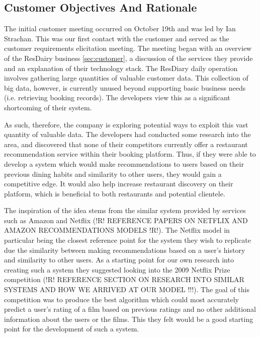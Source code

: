 \documentclass{l3proj}
\begin{document}

\subsection{Customer Objectives And Rationale}
\label{sec:custobjectives}


The initial customer meeting occurred on October 19th and was led by Ian Strachan. This was our first contact with the customer and served as the customer requirements elicitation meeting. The meeting began with an overview of the ResDairy business \ref{sec:customer}, a discussion of the services they provide and an explanation of their technology stack. The ResDiary daily operation involves gathering large quantities of valuable customer data. This collection of big data, however, is currently unused beyond supporting basic business needs (i.e. retrieving booking records). The developers view this as a significant shortcoming of their system.

As such, therefore, the company is exploring potential ways to exploit this vast quantity of valuable data. The developers had conducted some research into the area, and discovered that none of their competitors currently offer a restaurant recommendation service within their booking platform. Thus, if they were able to develop a system which would make recommendations to users based on their previous dining habits and similarity to other users, they would gain a competitive edge. It would also help increase restaurant discovery on their platform, which is beneficial to both restaurants and potential clientele. 

The inspiration of the idea stems from the similar system provided by services such as Amazon and Netflix (!R! REFERENCE PAPERS ON NETFLIX AND AMAZON RECOMMENDATIONS MODELS !R!). The Netflix model in particular being the closest reference point for the system they wish to replicate due the similarity between making recommendations based on a user’s history and similarity to other users. As a starting point for our own research into creating such a system they suggested looking into the 2009 Netflix Prize competition (!R! REFERENCE SECTION ON RESEARCH INTO SIMILAR SYSTEMS AND HOW WE ARRIVED AT OUR MODEL !!!). The goal of this competition was to produce the best algorithm which could most accurately predict a user’s rating of a film based on previous ratings and no other additional information about the users or the films. This they felt would be a good starting point for the development of such a system.
\end{document}
